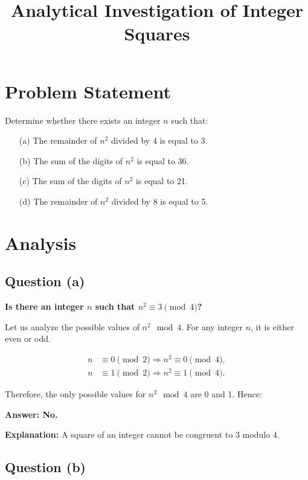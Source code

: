 \documentclass[12pt]{article}
\title{Analytical Investigation of Integer Squares}
\author{}
\date{}
\begin{document}
\maketitle

\section*{Problem Statement}

Determine whether there exists an integer \( n \) such that:

\begin{enumerate}
    \item[(a)] The remainder of \( n^2 \) divided by 4 is equal to 3.
    \item[(b)] The sum of the digits of \( n^2 \) is equal to 36.
    \item[(c)] The sum of the digits of \( n^2 \) is equal to 21.
    \item[(d)] The remainder of \( n^2 \) divided by 8 is equal to 5.
\end{enumerate}

\section{Analysis}

\subsection{Question (a)}

\textbf{Is there an integer \( n \) such that \( n^2 \equiv 3 \pmod{4} \)?}

Let us analyze the possible values of \( n^2 \mod 4 \). For any integer \( n \), it is either even or odd.

\[
\begin{aligned}
n &\equiv 0 \pmod{2} \Rightarrow n^2 \equiv 0 \pmod{4}, \\
n &\equiv 1 \pmod{2} \Rightarrow n^2 \equiv 1 \pmod{4}.
\end{aligned}
\]

Therefore, the only possible values for \( n^2 \mod 4 \) are 0 and 1. Hence:

\textbf{Answer: No.}

\textbf{Explanation:} A square of an integer cannot be congruent to 3 modulo 4.

\subsection{Question (b)}
\end{document}
